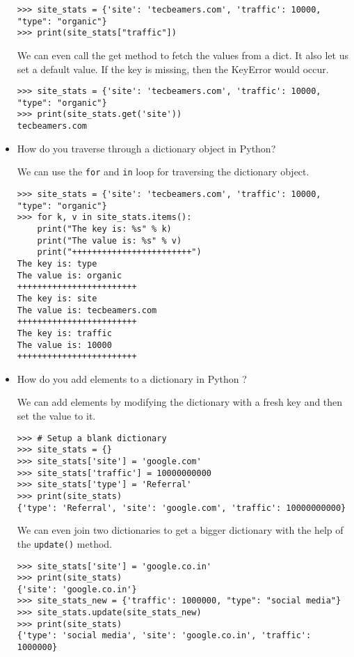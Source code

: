 \documentclass[11pt]{article}
\begin{document}
\begin{itemize}
\begin{verbatim}
>>> site_stats = {'site': 'tecbeamers.com', 'traffic': 10000, "type": "organic"}
>>> print(site_stats["traffic"])
\end{verbatim}

We can even call the get method to fetch the values from a dict. It also let us set a default value. If the key is missing, then the KeyError would occur.

\begin{verbatim}
>>> site_stats = {'site': 'tecbeamers.com', 'traffic': 10000, "type": "organic"}
>>> print(site_stats.get('site'))
tecbeamers.com
\end{verbatim}

\item How do you traverse through a dictionary object in Python?
  
  We can use the \verb;for; and \verb;in; loop for traversing the dictionary object.

\begin{verbatim}
>>> site_stats = {'site': 'tecbeamers.com', 'traffic': 10000, "type": "organic"}
>>> for k, v in site_stats.items():
    print("The key is: %s" % k)
    print("The value is: %s" % v)
    print("++++++++++++++++++++++++")
The key is: type
The value is: organic
++++++++++++++++++++++++
The key is: site
The value is: tecbeamers.com
++++++++++++++++++++++++
The key is: traffic
The value is: 10000
++++++++++++++++++++++++
\end{verbatim}

\item How do you add elements to a dictionary in Python ?
  
  We can add elements by modifying the dictionary with a fresh key and then set the value to it.

\begin{verbatim}
>>> # Setup a blank dictionary
>>> site_stats = {}
>>> site_stats['site'] = 'google.com'
>>> site_stats['traffic'] = 10000000000
>>> site_stats['type'] = 'Referral'
>>> print(site_stats)
{'type': 'Referral', 'site': 'google.com', 'traffic': 10000000000}
\end{verbatim}

We can even join two dictionaries to get a bigger dictionary with the help of the \verb;update(); method.

\begin{verbatim}
>>> site_stats['site'] = 'google.co.in'
>>> print(site_stats)
{'site': 'google.co.in'}
>>> site_stats_new = {'traffic': 1000000, "type": "social media"}
>>> site_stats.update(site_stats_new)
>>> print(site_stats)
{'type': 'social media', 'site': 'google.co.in', 'traffic': 1000000}
\end{verbatim}


\end{itemize}
\end{document}

